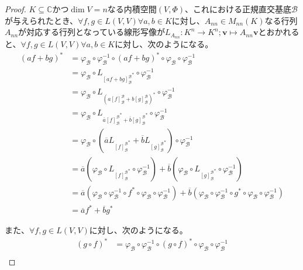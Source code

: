 \documentclass[dvipdfmx]{jsarticle}
\begin{document}
\begin{proof}
$K \subseteq \mathbb{C}$かつ$\dim V = n$なる内積空間$(V,\varPhi)$、これにおける正規直交基底$\mathcal{B}$が与えられたとき、$\forall f,g \in L(V,V)\forall a,b \in K$に対し、$A_{nn} \in M_{nn}(K)$なる行列$A_{nn}$が対応する行列となっている線形写像が$L_{A_{nn}}:K^{n} \rightarrow K^{n};\mathbf{v} \mapsto A_{nn}\mathbf{v}$とおかれると、$\forall f,g \in L(V,V)\forall a,b \in K$に対し、次のようになる。
\begin{align*}
(af + bg)^{*} &= \varphi_{\mathcal{B}} \circ \varphi_{\mathcal{B}}^{- 1} \circ (af + bg)^{*} \circ \varphi_{\mathcal{B}} \circ \varphi_{\mathcal{B}}^{- 1}\\
&= \varphi_{\mathcal{B}} \circ L_{{[ af + bg]_{\mathcal{B}}^{\mathcal{B}}}^{*}} \circ \varphi_{\mathcal{B}}^{- 1}\\
&= \varphi_{\mathcal{B}} \circ L_{\left( a[ f]_{\mathcal{B}}^{\mathcal{B}} + b[ g]_{\mathcal{B}}^{\mathcal{B}} \right)^{*}} \circ \varphi_{\mathcal{B}}^{- 1}\\
&= \varphi_{\mathcal{B}} \circ L_{\overline{a}{[ f]_{\mathcal{B}}^{\mathcal{B}}}^{*} + \overline{b}{[ g]_{\mathcal{B}}^{\mathcal{B}}}^{*}} \circ \varphi_{\mathcal{B}}^{- 1}\\
&= \varphi_{\mathcal{B}} \circ \left( \overline{a}L_{{[ f]_{\mathcal{B}}^{\mathcal{B}}}^{*}} + \overline{b}L_{{[ g]_{\mathcal{B}}^{\mathcal{B}}}^{*}} \right) \circ \varphi_{\mathcal{B}}^{- 1}\\
&= \overline{a}\left( \varphi_{\mathcal{B}} \circ L_{{[ f]_{\mathcal{B}}^{\mathcal{B}}}^{*}} \circ \varphi_{\mathcal{B}}^{- 1} \right) + \overline{b}\left( \varphi_{\mathcal{B}} \circ L_{{[ g]_{\mathcal{B}}^{\mathcal{B}}}^{*}} \circ \varphi_{\mathcal{B}}^{- 1} \right)\\
&= \overline{a}\left( \varphi_{\mathcal{B}} \circ \varphi_{\mathcal{B}}^{- 1} \circ f^{*} \circ \varphi_{\mathcal{B}} \circ \varphi_{\mathcal{B}}^{- 1} \right) + \overline{b}\left( \varphi_{\mathcal{B}} \circ \varphi_{\mathcal{B}}^{- 1} \circ g^{*} \circ \varphi_{\mathcal{B}} \circ \varphi_{\mathcal{B}}^{- 1} \right)\\
&= \overline{a}f^{*} + \overline{b}g^{*}
\end{align*}\par
また、$\forall f,g \in L(V,V)$に対し、次のようになる。
\begin{align*}
(g \circ f)^{*} &= \varphi_{\mathcal{B}} \circ \varphi_{\mathcal{B}}^{- 1} \circ (g \circ f)^{*} \circ \varphi_{\mathcal{B}} \circ \varphi_{\mathcal{B}}^{- 1}\\

\end{align*}
\end{proof}
\end{document}
